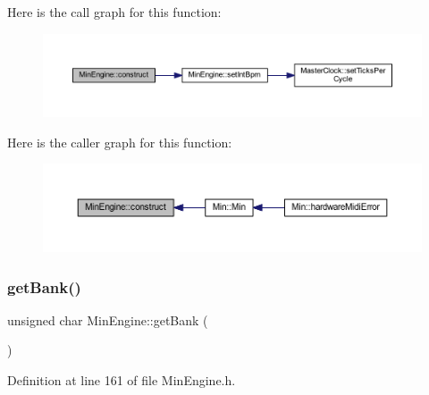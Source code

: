Here is the call graph for this function\+:
\nopagebreak
\begin{figure}[H]
\begin{center}
\leavevmode
\includegraphics[width=350pt]{class_min_engine_a9e00c7c1943063e4b707384738221365_cgraph}
\end{center}
\end{figure}
Here is the caller graph for this function\+:
\nopagebreak
\begin{figure}[H]
\begin{center}
\leavevmode
\includegraphics[width=350pt]{class_min_engine_a9e00c7c1943063e4b707384738221365_icgraph}
\end{center}
\end{figure}
\mbox{\label{class_min_engine_ae9224dca462d7a6233fb7c22210cc8a8}} 
\subsubsection{\texorpdfstring{get\+Bank()}{getBank()}}
{\footnotesize\ttfamily unsigned char Min\+Engine\+::get\+Bank (\begin{DoxyParamCaption}{ }\end{DoxyParamCaption})\hspace{0.3cm}{\ttfamily [inline]}}



Definition at line 161 of file Min\+Engine.\+h.

